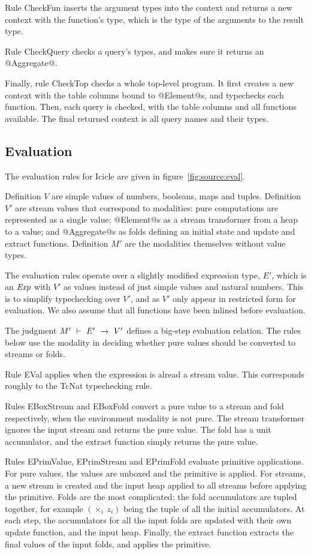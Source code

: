 Rule CheckFun inserts the argument types into the context and returns a new context with the function's type, which is the type of the arguments to the result type.

Rule CheckQuery checks a query's types, and makes sure it returns an @Aggregate@.

Finally, rule CheckTop checks a whole top-level program.
It first creates a new context with the table columns bound to @Element@s, and typechecks each function.
Then, each query is checked, with the table columns and all functions available.
The final returned context is all query names and their types.


\subsection{Evaluation}

The evaluation rules for Icicle are given in figure~\ref{fig:source:eval}.

Definition $V$ are simple values of numbers, booleans, maps and tuples.
Definition $V'$ are stream values that correspond to modalities: pure computations are represented as a single value;
@Element@s as a stream transformer from a heap to a value;
and @Aggregate@s as folds defining an initial state and update and extract functions.
Definition $M'$ are the modalities themselves without value types.


The evaluation rules operate over a slightly modified expression type, $E'$, which is an $\mathit{Exp}$ with $V'$ as values instead of just simple values and natural numbers.
This is to simplify typechecking over $V'$, and as $V'$ only appear in restricted form for evaluation.
We also assume that all functions have been inlined before evaluation.

The judgment $M'~\vdash~E'~\xrightarrow~~V'$ defines a big-step evaluation relation.
The rules below use the modality in deciding whether pure values should be converted to streams or folds.

Rule EVal applies when the expression is alread a stream value.
This corresponds roughly to the TcNat typechecking rule.

Rules EBoxStream and EBoxFold convert a pure value to a stream and fold respectively, when the environment modality is not pure.
The stream transformer ignores the input stream and returns the pure value.
The fold has a unit accumulator, and the extract function simply returns the pure value.

Rules EPrimValue, EPrimStream and EPrimFold evaluate primitive applications.
For pure values, the values are unboxed and the primitive is applied.
For streams, a new stream is created and the input heap applied to all streams before applying the primitive.
Folds are the most complicated: the fold accumulators are tupled together, for example $(\times_i~z_i)$ being the tuple of all the initial accumulators.
At each step, the accumulators for all the input folds are updated with their own update function, and the input heap.
Finally, the extract function extracts the final values of the input folds, and applies the primitive.

